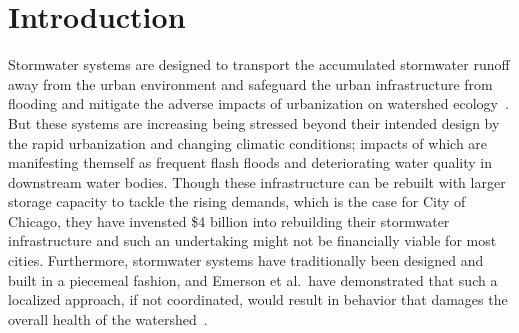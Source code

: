\chapter{Introduction}\label{ch:introduction}
Stormwater systems are designed to transport the accumulated stormwater runoff away from the urban environment and safeguard the urban infrastructure from flooding and mitigate the adverse impacts of urbanization on watershed ecology~\cite{national2009urban}.
But these systems are increasing being stressed beyond their intended design by the rapid urbanization and changing climatic conditions; impacts of which are manifesting themself as frequent flash floods and deteriorating water quality in downstream water bodies.
Though these infrastructure can be rebuilt with larger storage capacity to tackle the rising demands, which is the case for City of Chicago, they have invensted \$4 billion into rebuilding their stormwater infrastructure and such an undertaking might not be financially viable for most cities.
Furthermore, stormwater systems have traditionally been designed and built in a piecemeal fashion, and Emerson et al.\ have demonstrated that such a localized approach, if not coordinated, would result in behavior that damages the overall health of the watershed~\cite{Emerson2005Watershed-ScaleBasins}.


\


